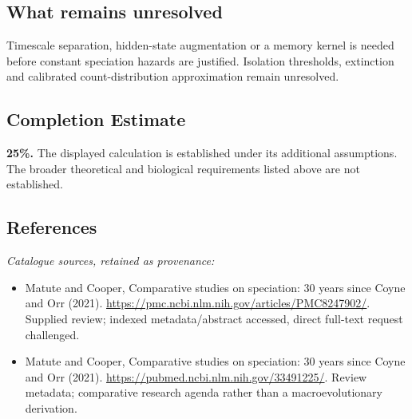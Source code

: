 \documentclass[11pt]{article}
\begin{document}
\subsection{What remains unresolved}
Timescale separation, hidden-state augmentation or a memory kernel is needed before constant speciation hazards are justified. Isolation thresholds, extinction and calibrated count-distribution approximation remain unresolved.
\subsection{Completion Estimate}
\textbf{25\%.} The displayed calculation is established under its additional assumptions. The broader theoretical and biological requirements listed above are not established.
\subsection{References}
\noindent\emph{Catalogue sources, retained as provenance:}
\begin{itemize}
\item Matute and Cooper, Comparative studies on speciation: 30 years since Coyne and Orr (2021). \url{https://pmc.ncbi.nlm.nih.gov/articles/PMC8247902/}. Supplied review; indexed metadata/abstract accessed, direct full-text request challenged.
\item Matute and Cooper, Comparative studies on speciation: 30 years since Coyne and Orr (2021). \url{https://pubmed.ncbi.nlm.nih.gov/33491225/}. Review metadata; comparative research agenda rather than a macroevolutionary derivation.
\end{itemize}
\end{document}
